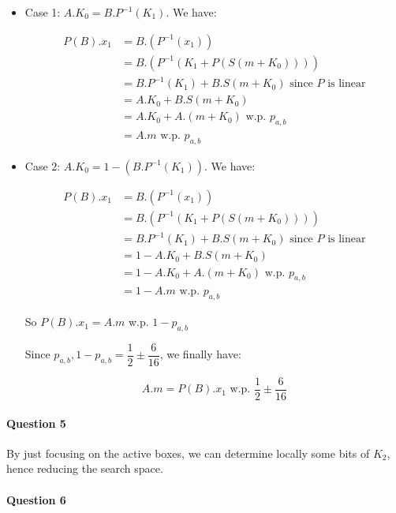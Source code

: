\documentclass[a4paper]{article}
\begin{document}
\begin{itemize}

\item Case 1: $A . K_0 = B . P^{-1}(K_1)$. We have:

\begin{align*}
P(B).x_1 &= B.(P^{-1}(x_1)) \\
	&= B.(P^{-1}(K_1 + P(S(m + K_0)))) \\
	&= B.P^{-1}(K_1) + B.S(m + K_0) \text{ since $P$ is linear} \\
	&= A.K_0 + B.S(m + K_0) \\
	&= A.K_0 + A.(m + K_0) \text{ w.p. $p_{a,b}$} \\
	&= A.m \text{ w.p. $p_{a,b}$}
\end{align*}

\item Case 2: $A . K_0 = 1 - (B . P^{-1}(K_1))$. We have:

\begin{align*}
P(B).x_1 &= B.(P^{-1}(x_1)) \\
	&= B.(P^{-1}(K_1 + P(S(m + K_0)))) \\
	&= B.P^{-1}(K_1) + B.S(m + K_0) \text{ since $P$ is linear} \\
	&= 1 - A.K_0 + B.S(m + K_0) \\
	&= 1 - A.K_0 + A.(m + K_0) \text{ w.p. $p_{a,b}$} \\
	&= 1 - A.m \text{ w.p. $p_{a,b}$}
\end{align*}

So $P(B).x_1 = A.m$ w.p. $1 - p_{a,b}$

Since $p_{a,b}, 1 - p_{a,b} = \dfrac{1}{2} \pm \dfrac{6}{16}$, we finally have:

\begin{equation*}
A.m = P(B).x_1 \text{ w.p. } \dfrac{1}{2} \pm \dfrac{6}{16}
\end{equation*}

\end{itemize}

\paragraph{Question 5}

By just focusing on the active boxes, we can determine locally some bits of $K_2$, hence reducing the search space.

\paragraph{Question 6}
\end{document}
